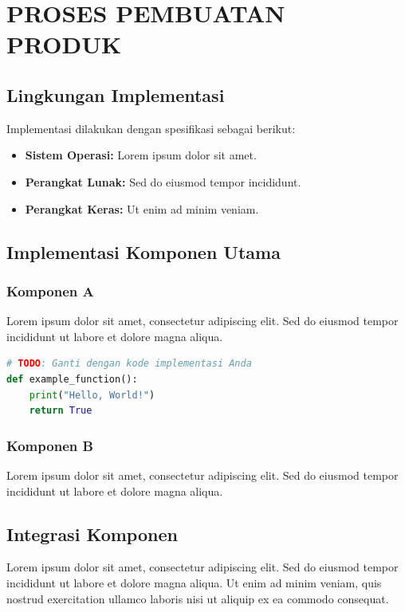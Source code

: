 \chapter{PROSES PEMBUATAN PRODUK}

\section{Lingkungan Implementasi}


Implementasi dilakukan dengan spesifikasi sebagai berikut:

\begin{itemize}
    \item \textbf{Sistem Operasi:} Lorem ipsum dolor sit amet.
    \item \textbf{Perangkat Lunak:} Sed do eiusmod tempor incididunt.
    \item \textbf{Perangkat Keras:} Ut enim ad minim veniam.
\end{itemize}

\section{Implementasi Komponen Utama}

\subsection{Komponen A}


Lorem ipsum dolor sit amet, consectetur adipiscing elit. Sed do eiusmod tempor incididunt ut labore et dolore magna aliqua.

\begin{lstlisting}[language=python, caption={Contoh Kode}]
# TODO: Ganti dengan kode implementasi Anda
def example_function():
    print("Hello, World!")
    return True
\end{lstlisting}

\subsection{Komponen B}


Lorem ipsum dolor sit amet, consectetur adipiscing elit. Sed do eiusmod tempor incididunt ut labore et dolore magna aliqua.

\section{Integrasi Komponen}


Lorem ipsum dolor sit amet, consectetur adipiscing elit. Sed do eiusmod tempor incididunt ut labore et dolore magna aliqua. Ut enim ad minim veniam, quis nostrud exercitation ullamco laboris nisi ut aliquip ex ea commodo consequat.
